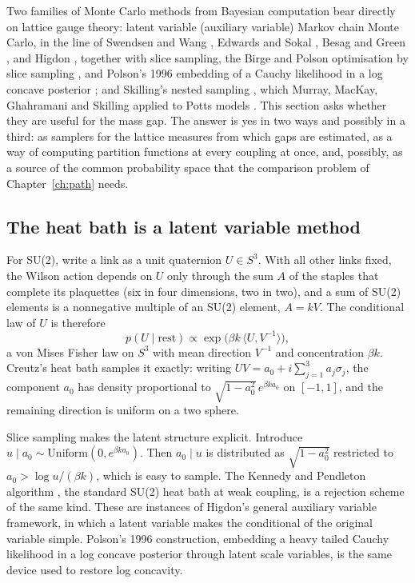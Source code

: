 Two families of Monte Carlo methods from Bayesian computation bear directly on lattice gauge theory: latent variable (auxiliary variable) Markov chain Monte Carlo, in the line of Swendsen and Wang \cite{SW87}, Edwards and Sokal \cite{ES88}, Besag and Green \cite{BG93}, and Higdon \cite{Hi98}, together with slice sampling, the Birge and Polson optimisation by slice sampling \cite{BP}, and Polson's 1996 embedding of a Cauchy likelihood in a log concave posterior \cite{Po96}; and Skilling's nested sampling \cite{Sk06}, which Murray, MacKay, Ghahramani and Skilling applied to Potts models \cite{MMGS}. This section asks whether they are useful for the mass gap. The answer is yes in two ways and possibly in a third: as samplers for the lattice measures from which gaps are estimated, as a way of computing partition functions at every coupling at once, and, possibly, as a source of the common probability space that the comparison problem of Chapter~\ref{ch:path} needs.

\subsection{The heat bath is a latent variable method}

For SU(2), write a link as a unit quaternion $U\in S^3$. With all other links fixed, the Wilson action depends on $U$ only through the sum $A$ of the staples that complete its plaquettes (six in four dimensions, two in two), and a sum of SU(2) elements is a nonnegative multiple of an SU(2) element, $A=kV$. The conditional law of $U$ is therefore
\[
p(U\mid\text{rest})\propto\exp\big(\beta k\,\langle U,V^{-1}\rangle\big),
\]
a von Mises Fisher law on $S^3$ with mean direction $V^{-1}$ and concentration $\beta k$. Creutz's heat bath \cite{Cr80} samples it exactly: writing $UV=a_0+i\sum_{j=1}^3a_j\sigma_j$, the component $a_0$ has density proportional to $\sqrt{1-a_0^2}\,e^{\beta ka_0}$ on $[-1,1]$, and the remaining direction is uniform on a two sphere.

Slice sampling makes the latent structure explicit. Introduce $u\mid a_0\sim\mathrm{Uniform}(0,e^{\beta ka_0})$. Then $a_0\mid u$ is distributed as $\sqrt{1-a_0^2}$ restricted to $a_0>\log u/(\beta k)$, which is easy to sample. The Kennedy and Pendleton algorithm \cite{KP85}, the standard SU(2) heat bath at weak coupling, is a rejection scheme of the same kind. These are instances of Higdon's general auxiliary variable framework, in which a latent variable makes the conditional of the original variable simple. Polson's 1996 construction, embedding a heavy tailed Cauchy likelihood in a log concave posterior through latent scale variables, is the same device used to restore log concavity.

